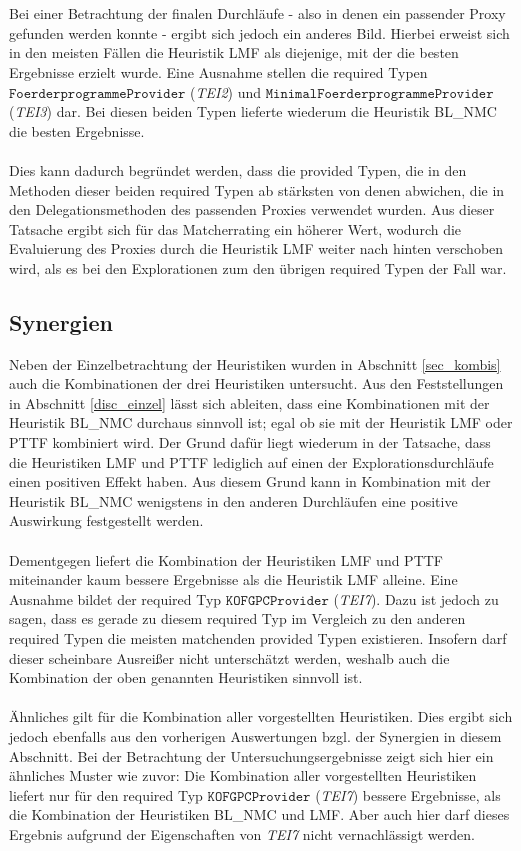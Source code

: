 \\\\
Bei einer Betrachtung der finalen Durchläufe - also in denen ein passender Proxy gefunden werden konnte - ergibt sich jedoch ein anderes Bild. Hierbei erweist sich in den meisten Fällen die Heuristik LMF als diejenige, mit der die besten Ergebnisse erzielt wurde. Eine Ausnahme stellen die required Typen $\texttt{FoerderprogrammeProvider}$ (\emph{TEI2}) und $\texttt{MinimalFoerderprogrammeProvider}$ (\emph{TEI3}) dar. Bei diesen beiden Typen lieferte wiederum die Heuristik BL\_NMC die besten Ergebnisse.
\\\\
Dies kann dadurch begründet werden, dass die provided Typen, die in den Methoden dieser beiden required Typen ab stärksten von denen abwichen, die in den Delegationsmethoden des passenden Proxies verwendet wurden. Aus dieser Tatsache ergibt sich für das Matcherrating ein höherer Wert, wodurch die Evaluierung des Proxies durch die Heuristik LMF weiter nach hinten verschoben wird, als es bei den Explorationen zum den übrigen required Typen der Fall war.
\subsection{Synergien}
Neben der Einzelbetrachtung der Heuristiken wurden in Abschnitt \ref{sec_kombis} auch die Kombinationen der drei Heuristiken untersucht. Aus den Feststellungen in Abschnitt \ref{disc_einzel} lässt sich ableiten, dass eine Kombinationen mit der Heuristik BL\_NMC durchaus sinnvoll ist; egal ob sie mit der Heuristik LMF oder PTTF kombiniert wird. Der Grund dafür liegt wiederum in der Tatsache, dass die Heuristiken LMF und PTTF lediglich auf einen der Explorationsdurchläufe einen positiven Effekt haben. Aus diesem Grund kann in Kombination mit der Heuristik BL\_NMC wenigstens in den anderen Durchläufen eine positive Auswirkung festgestellt werden.
\\\\
Dementgegen liefert die Kombination der Heuristiken LMF und PTTF miteinander kaum bessere Ergebnisse als die Heuristik LMF alleine. Eine Ausnahme bildet der required Typ $\texttt{KOFGPCProvider}$ (\emph{TEI7}). Dazu ist jedoch zu sagen, dass es gerade zu diesem required Typ im Vergleich zu den anderen required Typen die meisten matchenden provided Typen existieren. Insofern darf dieser scheinbare Ausreißer nicht unterschätzt werden, weshalb auch die Kombination der oben genannten Heuristiken sinnvoll ist.
\\\\
Ähnliches gilt für die Kombination aller vorgestellten Heuristiken. Dies ergibt sich jedoch ebenfalls aus den vorherigen Auswertungen bzgl. der Synergien in diesem Abschnitt. Bei der Betrachtung der Untersuchungsergebnisse zeigt sich hier ein ähnliches Muster wie zuvor: Die Kombination aller vorgestellten Heuristiken liefert nur für den required Typ $\texttt{KOFGPCProvider}$ (\emph{TEI7}) bessere Ergebnisse, als die Kombination der Heuristiken BL\_NMC und LMF. Aber auch hier darf dieses Ergebnis aufgrund der Eigenschaften von \emph{TEI7} nicht vernachlässigt werden.
